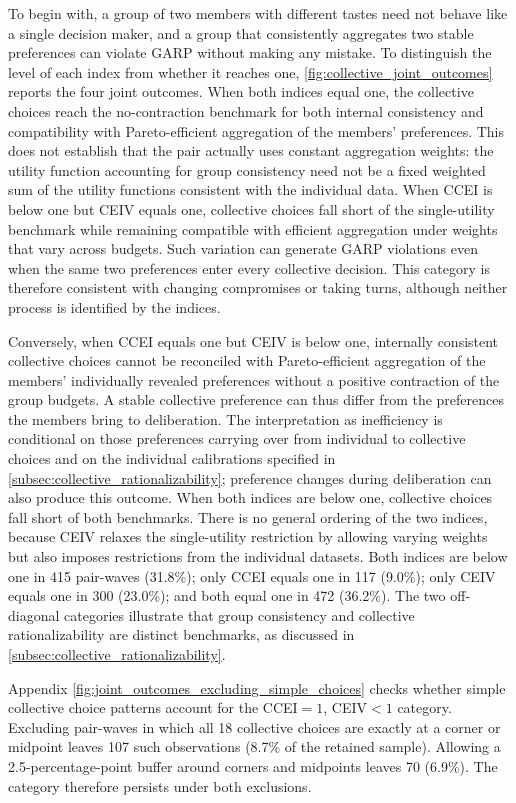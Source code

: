 \documentclass[11 pt]{article}
\begin{document}
To begin with, a group of two members with different tastes need not behave like a single decision maker, and a group that consistently aggregates two stable preferences can violate GARP without making any mistake. To distinguish the level of each index from whether it reaches one, \autoref{fig:collective_joint_outcomes} reports the four joint outcomes. When both indices equal one, the collective choices reach the no-contraction benchmark for both internal consistency and compatibility with Pareto-efficient aggregation of the members' preferences. This does not establish that the pair actually uses constant aggregation weights: the utility function accounting for group consistency need not be a fixed weighted sum of the utility functions consistent with the individual data. When CCEI is below one but CEIV equals one, collective choices fall short of the single-utility benchmark while remaining compatible with efficient aggregation under weights that vary across budgets. Such variation can generate GARP violations even when the same two preferences enter every collective decision. This category is therefore consistent with changing compromises or taking turns, although neither process is identified by the indices.

Conversely, when CCEI equals one but CEIV is below one, internally consistent collective choices cannot be reconciled with Pareto-efficient aggregation of the members' individually revealed preferences without a positive contraction of the group budgets. A stable collective preference can thus differ from the preferences the members bring to deliberation. The interpretation as inefficiency is conditional on those preferences carrying over from individual to collective choices and on the individual calibrations specified in \autoref{subsec:collective_rationalizability}; preference changes during deliberation can also produce this outcome. When both indices are below one, collective choices fall short of both benchmarks. There is no general ordering of the two indices, because CEIV relaxes the single-utility restriction by allowing varying weights but also imposes restrictions from the individual datasets. Both indices are below one in 415 pair-waves (31.8\%); only CCEI equals one in 117 (9.0\%); only CEIV equals one in 300 (23.0\%); and both equal one in 472 (36.2\%). The two off-diagonal categories illustrate that group consistency and collective rationalizability are distinct benchmarks, as discussed in \autoref{subsec:collective_rationalizability}.

Appendix \autoref{fig:joint_outcomes_excluding_simple_choices} checks whether simple collective choice patterns account for the CCEI$=1$, CEIV$<1$ category. Excluding pair-waves in which all 18 collective choices are exactly at a corner or midpoint leaves 107 such observations (8.7\% of the retained sample). Allowing a 2.5-percentage-point buffer around corners and midpoints leaves 70 (6.9\%). The category therefore persists under both exclusions.
\end{document}
